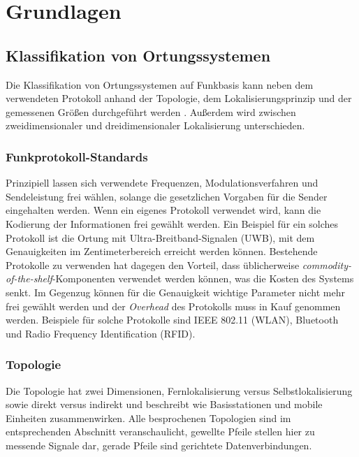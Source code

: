 \chapter{Grundlagen}
\label{ch:Grundlagen}

\section{Klassifikation von Ortungssystemen}
\label{ch:Einleitung:sec:Ortungssysteme}
Die Klassifikation von Ortungssystemen auf Funkbasis kann neben dem verwendeten Protokoll anhand der Topologie, dem Lokalisierungsprinzip und der gemessenen Größen durchgeführt werden \cite{liu2007survey}.
Außerdem wird zwischen zweidimensionaler und dreidimensionaler Lokalisierung unterschieden.

\subsection{Funkprotokoll-Standards}
Prinzipiell lassen sich verwendete Frequenzen, Modulationsverfahren und Sendeleistung frei wählen, solange die gesetzlichen Vorgaben für die Sender eingehalten werden. Wenn ein eigenes Protokoll verwendet wird, kann die Kodierung der Informationen frei gewählt werden. 
Ein Beispiel für ein solches Protokoll ist die Ortung mit Ultra-Breitband-Signalen (UWB), mit dem Genauigkeiten im Zentimeterbereich erreicht werden können. Bestehende Protokolle zu verwenden hat dagegen den Vorteil, dass üblicherweise \emph{commodity-of-the-shelf}-Komponenten verwendet werden können, was die Kosten des Systems senkt. Im Gegenzug können für die Genauigkeit wichtige Parameter nicht mehr frei gewählt werden und der \emph{Overhead} des Protokolls muss in Kauf genommen werden. Beispiele für solche Protokolle sind IEEE 802.11 (WLAN), Bluetooth und Radio Frequency Identification (RFID).

\subsection{Topologie}
Die Topologie hat zwei Dimensionen, Fernlokalisierung versus Selbstlokalisierung sowie direkt versus indirekt und beschreibt wie Basisstationen und mobile Einheiten zusammenwirken. 
Alle besprochenen Topologien sind im entsprechenden Abschnitt veranschaulicht, gewellte Pfeile stellen hier zu messende Signale dar, gerade Pfeile sind gerichtete Datenverbindungen.


